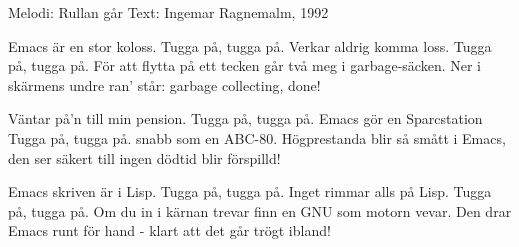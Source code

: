 \begin{song}

\begin{songmeta}
Melodi: Rullan går
Text: Ingemar Ragnemalm, 1992
\end{songmeta}

\begin{songtext}
Emacs är en stor koloss.
Tugga på, tugga på.
Verkar aldrig komma loss.
Tugga på, tugga på.
För att flytta på ett tecken
går två meg i garbage-säcken.
Ner i skärmens undre ran'
står: garbage collecting, done!

Väntar på'n till min pension.
Tugga på, tugga på.
Emacs gör en Sparcstation
Tugga på, tugga på.
snabb som en ABC-80.
Högprestanda blir så smått i
Emacs, den ser säkert till
ingen dödtid blir förspilld!

Emacs skriven är i Lisp.
Tugga på, tugga på.
Inget rimmar alls på Lisp.
Tugga på, tugga på.
Om du in i kärnan trevar
finn en GNU som motorn vevar.
Den drar Emacs runt för hand
- klart att det går trögt ibland!
\end{songtext}
\end{song}
